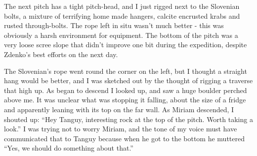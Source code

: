 The next pitch has a tight pitch-head, and I just rigged next to the Slovenian bolts, a mixture of terrifying home made hangers, calcite encrusted krabs and rusted through-bolts. The rope left in situ wasn’t much better - this was obviously a harsh environment for equipment. The bottom of the pitch was a very loose scree slope that didn’t improve one bit during the expedition, despite Zdenko’s best efforts on the next day.

The Slovenian’s rope went round the corner on the left, but I thought a straight hang would be better, and I was sketched out by the thought of rigging a traverse that high up. As began to descend I looked up, and saw a huge boulder perched above me. It was unclear what was stopping it falling, about the size of a fridge and apparently leaning with its top on the far wall. As Miriam descended, I shouted up: “Hey Tanguy, interesting rock at the top of the pitch. Worth taking a look.” I was trying not to worry Miriam, and the tone of my voice must have communicated that to Tanguy because when he got to the bottom he muttered “Yes, we should do something about that.”

